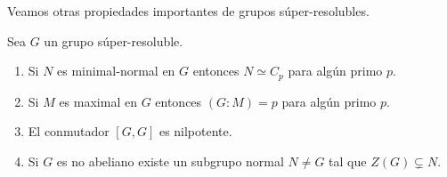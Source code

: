 Veamos otras propiedades importantes de grupos súper-resolubles. 

\begin{theorem}
	\label{theorem:super_structure}
	Sea $G$ un grupo súper-resoluble. 
	\begin{enumerate}
		\item Si $N$ es minimal-normal en $G$ entonces $N\simeq C_p$ para algún primo $p$.
		\item Si $M$ es maximal en $G$ entonces $(G:M)=p$ para algún primo $p$.
		\item El conmutador $[G,G]$ es nilpotente.
		\item Si $G$ es no abeliano existe un subgrupo normal $N\ne G$ tal que
			$Z(G)\subsetneq N$.
	\end{enumerate}
\end{theorem}

